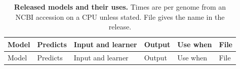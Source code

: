 \documentclass[10pt,a4paper,onecolumn]{article}
\begin{document}
{\begin{longtable}[]{@{}
  >{\raggedright\arraybackslash}p{}
  >{\raggedright\arraybackslash}p{}
  >{\raggedright\arraybackslash}p{}
  >{\raggedright\arraybackslash}p{}
  >{\raggedright\arraybackslash}p{}
  >{\raggedright\arraybackslash}p{}@{}}
\caption{\textbf{Released models and their uses.} Times are per genome
from an NCBI accession on a CPU unless stated. File gives the name in
the release. \label{tab:s_models}}\tabularnewline
\toprule\noalign{}
\begin{minipage}[b]{\linewidth}\raggedright
Model
\end{minipage} & \begin{minipage}[b]{\linewidth}\raggedright
Predicts
\end{minipage} & \begin{minipage}[b]{\linewidth}\raggedright
Input and learner
\end{minipage} & \begin{minipage}[b]{\linewidth}\raggedright
Output
\end{minipage} & \begin{minipage}[b]{\linewidth}\raggedright
Use when
\end{minipage} & \begin{minipage}[b]{\linewidth}\raggedright
File
\end{minipage} \\
\midrule\noalign{}
\endfirsthead
\toprule\noalign{}
\begin{minipage}[b]{\linewidth}\raggedright
Model
\end{minipage} & \begin{minipage}[b]{\linewidth}\raggedright
Predicts
\end{minipage} & \begin{minipage}[b]{\linewidth}\raggedright
Input and learner
\end{minipage} & \begin{minipage}[b]{\linewidth}\raggedright
Output
\end{minipage} & \begin{minipage}[b]{\linewidth}\raggedright
Use when
\end{minipage} & \begin{minipage}[b]{\linewidth}\raggedright
File
\end{minipage} \\

\end{longtable}}
\end{document}
